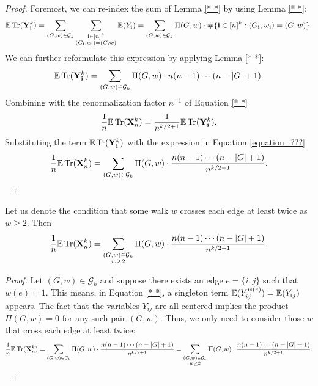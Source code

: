 \begin{proof}
  Foremost, we can re-index the sum of Lemma \ref{* *} by using Lemma \ref{* *}: 
  \[ 
  {\mathbb{E}} \operatorname{Tr} (\mathbf{Y}_\mathbf{i}^k) 
  = \sum_{(G,w) \in \mathcal{G}_k} \sum_{\substack{\mathbf{i} \in [n]^k \\ (G_\mathbf{i},w_\mathbf{i}) = (G,w)}} {\mathbb{E}} (Y_\mathbf{i})
  = \sum_{(G,w) \in \mathcal{G}_k} \Pi (G,w) \cdot \# \{ \mathbf{i} \in [n]^k : (G_\mathbf{i},w_\mathbf{i}) = (G,w) \}.
  \]
  We can further reformulate this expression by applying Lemma \ref{* *}:
  \begin{equation}\label{equation_???}
  {\mathbb{E}} \operatorname{Tr} (\mathbf{Y}_\mathbf{i}^k)
  = \sum_{(G,w) \in \mathcal{G}_k} \Pi (G,w) \cdot n (n-1) \cdots (n - |G| + 1).
  \end{equation}
  Combining with the renormalization factor $n^{-1}$ of Equation \ref{* *}
  \[
  \frac{1}{n} {\mathbb{E}} \operatorname{Tr} (\mathbf{X}_n^k) = \frac{1}{n^{k/2+1}} {\mathbb{E}} \operatorname{Tr} (\mathbf{Y}_\mathbf{i}^k).
  \]
  Substituting the term ${\mathbb{E}} \operatorname{Tr} (\mathbf{Y}_\mathbf{i}^k)$ with the expression in Equation \ref{equation_???}
  \[
  \frac{1}{n} {\mathbb{E}} \operatorname{Tr} (\mathbf{X}_n^k) = \sum_{\substack{(G,w) \in \mathcal{G}_k}} \Pi (G,w) \cdot \frac{n (n-1) \cdots (n - |G| + 1)}{n^{k/2+1}}.
  \]
\end{proof}
\begin{lemma}
  \label{lem:}
  \uses{}
  Let us denote the condition that some walk $w$ crosses each edge at least twice as $w \geq 2$. Then
  \[
  \frac{1}{n} {\mathbb{E}} \operatorname{Tr} (\mathbf{X}_n^k) 
  = \sum_{\substack{(G,w) \in \mathcal{G}_k \\ w \geq 2}} \Pi (G,w) \cdot \frac{n (n-1) \cdots (n - |G| + 1)}{n^{k/2+1}}.
  \]
\end{lemma}
\begin{proof}
  Let $(G,w) \in \mathcal{G}_k$ and suppose there exists an edge $e = \{i,j\}$ such that $w(e) = 1$.
  This means, in Equation \ref{* *}, a singleton term ${\mathbb{E}} (Y_{ij}^{w(e)}) = {\mathbb{E}} (Y_{ij})$ appears.
  The fact that the variables $Y_{ij}$ are all centered implies the product $\Pi (G,w) = 0$ for any such pair $(G,w)$.
  Thus, we only need to consider those $w$ that cross each edge at least twice: 
  \[
  \frac{1}{n} {\mathbb{E}} \operatorname{Tr} (\mathbf{X}_n^k) = \sum_{\substack{(G,w) \in \mathcal{G}_k}} \Pi (G,w) \cdot \frac{n (n-1) \cdots (n - |G| + 1)}{n^{k/2+1}}  = \sum_{\substack{(G,w) \in \mathcal{G}_k \\ w \geq 2}} \Pi (G,w) \cdot \frac{n (n-1) \cdots (n - |G| + 1)}{n^{k/2+1}}.
  \]
\end{proof}
